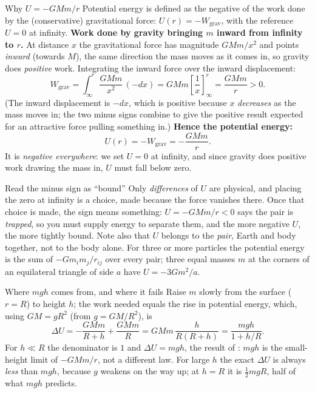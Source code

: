 \begin{derivbox}{Why $U=-GMm/r$}
Potential energy is defined as the negative of the work done by the (conservative) gravitational force:
$U(r)=-W_{\text{grav}}$, with the reference $U=0$ at infinity.
 \textbf{Work done by gravity bringing $m$ inward from infinity to $r$.} At distance $x$ the
gravitational force has magnitude $GMm/x^2$ and points \emph{inward} (towards $M$), the same direction the
mass moves as it comes in, so gravity does \emph{positive} work. Integrating the inward force over the
inward displacement:
\[
W_{\text{grav}}=\int_{\infty}^{r}\frac{GMm}{x^2}\,(-dx)=GMm\left[\frac{1}{x}\right]_{\infty}^{r}=\frac{GMm}{r}>0.
\]
(The inward displacement is $-dx$, which is positive because $x$ \emph{decreases} as the mass moves in;
the two minus signs combine to give the positive result expected for an attractive force pulling
something in.)
 \textbf{Hence the potential energy:}
\[
U(r)=-W_{\text{grav}}=-\frac{GMm}{r}.
\]
It is \emph{negative everywhere}: we set $U=0$ at infinity, and since gravity does positive work drawing
the mass in, $U$ must fall below zero.
\end{derivbox}

\begin{remarkbox}{Read the minus sign as ``bound''}
Only \emph{differences} of $U$ are physical, and placing the zero at infinity is a choice, made because
the force vanishes there. Once that choice is made, the sign means something: $U=-GMm/r<0$ says the pair
is \emph{trapped}, so you must supply energy to separate them, and the more negative $U$, the more
tightly bound. Note also that $U$ belongs to the \emph{pair}, Earth and body together, not to the body
alone. For three or more particles the potential energy is the sum of $-Gm_im_j/r_{ij}$ over every pair;
three equal masses $m$ at the corners of an equilateral triangle of side $a$ have $U=-3Gm^2/a$.
\end{remarkbox}

\begin{derivbox}{Where $mgh$ comes from, and where it fails}
Raise $m$ slowly from the surface ($r=R$) to height $h$; the work needed equals the rise in potential
energy, which, using $GM=gR^2$ (from $g=GM/R^2$), is
\[
\Delta U=-\frac{GMm}{R+h}+\frac{GMm}{R}=GMm\,\frac{h}{R(R+h)}=\frac{mgh}{1+h/R}.
\]
For $h\ll R$ the denominator is $1$ and $\Delta U=mgh$, the result of : $mgh$ is the
small-height limit of $-GMm/r$, not a different law. For large $h$ the exact $\Delta U$ is always
\emph{less} than $mgh$, because $g$ weakens on the way up; at $h=R$ it is $\tfrac12mgR$, half of what
$mgh$ predicts.
\end{derivbox}

